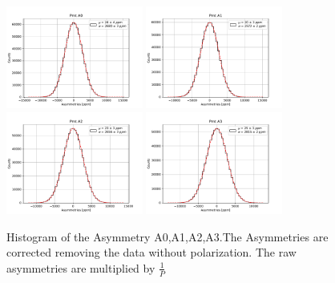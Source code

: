 \begin{figure}[!h]
\centering
\includegraphics[width = 0.40\textwidth]{Analysis/Histogram/A0.pdf} 
\includegraphics[width = 0.40\textwidth]{Analysis/Histogram/A1.pdf}\\
\includegraphics[width = 0.40\textwidth]{Analysis/Histogram/A2.pdf} 
\includegraphics[width = 0.40\textwidth]{Analysis/Histogram/A3.pdf}
\caption{Histogram of the Asymmetry A0,A1,A2,A3.The Asymmetries are corrected removing the data without polarization. The raw asymmetries are multiplied by $\frac{1}{P}$}
\label{fig:AsymmtriesA0A1A2A3}
\end{figure}

